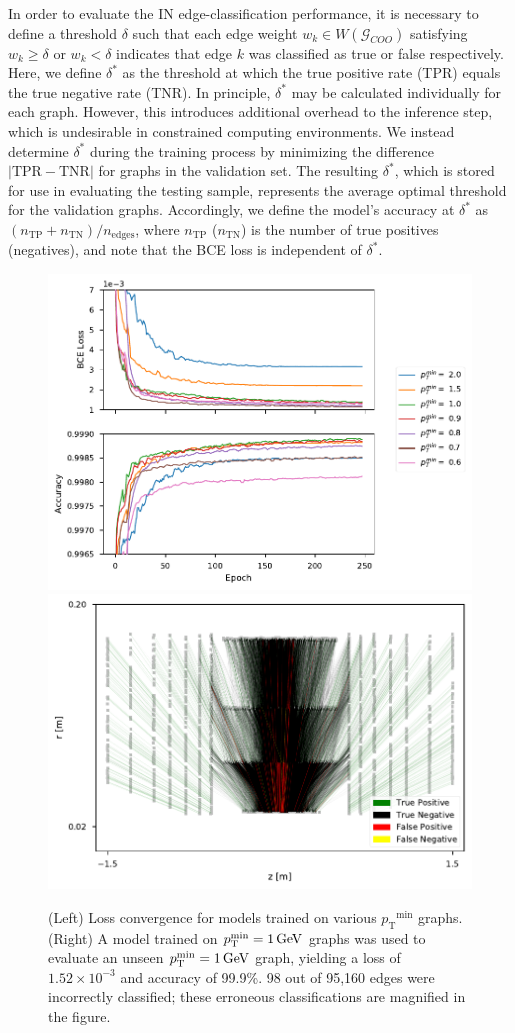 \documentclass[twocolumn]{svjour3}
\newcommand{\pt}{\ensuremath{p_{\mathrm{T}}}\xspace}
\newcommand{\GeV}{\ensuremath{\,\text{Ge\hspace{-.08em}V}}\xspace}
\newcommand{\nedges}{\ensuremath{n_\mathrm{edges}\xspace}}
\begin{document}
In order to evaluate the IN edge-classification performance, it is necessary to define a threshold $\delta$ such that each edge weight $w_k\in W(\mathcal{G}_{COO})$ satisfying $w_k\geq\delta$ or $w_k<\delta$ indicates that edge $k$ was classified as true or false respectively. 
Here, we define $\delta^*$ as the threshold at which the true positive rate (TPR) equals the true negative rate (TNR). 
In principle, $\delta^*$ may be calculated individually for each graph. 
However, this introduces additional overhead to the inference step, which is undesirable in constrained computing environments. 
We instead determine $\delta^*$ during the training process by minimizing the difference $|\mathrm{TPR}-\mathrm{TNR}|$ for graphs in the validation set. 
The resulting $\delta^*$, which is stored for use in evaluating the testing sample, represents the average optimal threshold for the validation graphs. 
Accordingly, we define the model's accuracy at $\delta^*$ as $(n_\mathrm{TP}+n_\mathrm{TN})/\nedges$, where $n_\mathrm{TP}$  ($n_\mathrm{TN}$) is the number of true positives (negatives), and note that the BCE loss is independent of $\delta^*$. 

\begin{figure}[!htbp]
\centering
  \includegraphics[width=.45\linewidth]{training_convergence.pdf}
  \includegraphics[width=.5\linewidth]{confusion_matrix_graph.pdf}
\caption{(Left) Loss convergence for models trained on various $\pt^\mathrm{min}$ graphs. 
(Right) A model trained on $\pt^\mathrm{min}=1\GeV$ graphs was used to evaluate an unseen $\pt^\mathrm{min}=1\GeV$ graph, yielding a loss of $1.52\times10^{-3}$ and accuracy of 99.9\%. 
98 out of 95,160 edges were incorrectly classified; these erroneous classifications are magnified in the figure.}
\label{fig:classification}
\end{figure}
\end{document}
